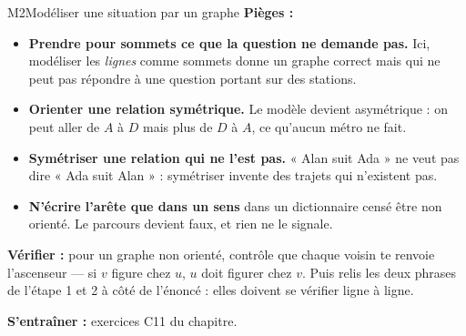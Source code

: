 \begin{fichemethode}{M2}{Modéliser une situation par un graphe}
\textbf{Pièges :}
\begin{itemize}
  \item \textbf{Prendre pour sommets ce que la question ne demande pas.} Ici, modéliser les
    \emph{lignes} comme sommets donne un graphe correct mais qui ne peut pas répondre à une
    question portant sur des stations.
  \item \textbf{Orienter une relation symétrique.} Le modèle devient asymétrique : on peut
    aller de $A$ à $D$ mais plus de $D$ à $A$, ce qu'aucun métro ne fait.
  \item \textbf{Symétriser une relation qui ne l'est pas.} « Alan suit Ada » ne veut pas dire
    « Ada suit Alan » : symétriser invente des trajets qui n'existent pas.
  \item \textbf{N'écrire l'arête que dans un sens} dans un dictionnaire censé être non
    orienté. Le parcours devient faux, et rien ne le signale.
\end{itemize}

\textbf{Vérifier :} pour un graphe non orienté, contrôle que chaque voisin te renvoie
l'ascenseur — si $v$ figure chez $u$, $u$ doit figurer chez $v$. Puis relis les deux phrases
de l'étape 1 et 2 à côté de l'énoncé : elles doivent se vérifier ligne à ligne.

\textbf{S'entraîner :} exercices C11 du chapitre.
\end{fichemethode}
